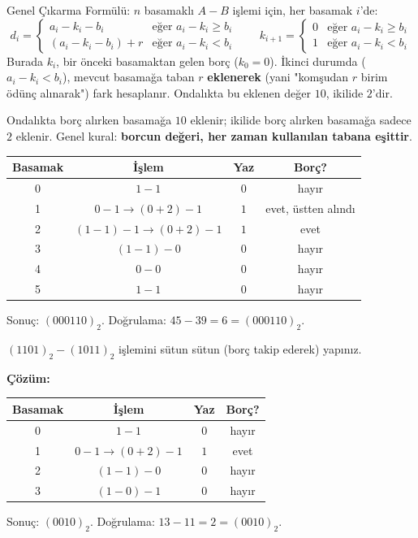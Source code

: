 \begin{tanim}{Genel Çıkarma Formülü:}
$n$ basamaklı $A-B$ işlemi için, her basamak $i$'de:
\[
d_i = \begin{cases}
a_i-k_i-b_i & \text{eğer } a_i-k_i \ge b_i \\
(a_i-k_i-b_i)+r & \text{eğer } a_i-k_i < b_i
\end{cases}
\qquad
k_{i+1} = \begin{cases}
0 & \text{eğer } a_i-k_i \ge b_i \\
1 & \text{eğer } a_i-k_i < b_i
\end{cases}
\]
Burada $k_i$, bir önceki basamaktan gelen borç ($k_0{=}0$). İkinci durumda ($a_i-k_i<b_i$),
mevcut basamağa taban $r$ \textbf{eklenerek} (yani "komşudan $r$ birim ödünç alınarak") fark
hesaplanır. Ondalıkta bu eklenen değer $10$, ikilide $2$'dir.
\end{tanim}

Ondalıkta borç alırken basamağa $10$ eklenir; ikilide borç alırken basamağa sadece $2$
eklenir. Genel kural: \textbf{borcun değeri, her zaman kullanılan tabana eşittir}.

\begin{ornek}[$(101101)_2-(100111)_2$]
\begin{center}
\begin{tabular}{cccc}
\toprule
Basamak & İşlem & Yaz & Borç? \\
\midrule
0 & $1-1$ & $0$ & hayır \\
1 & $0-1 \to (0+2)-1$ & $1$ & evet, üstten alındı \\
2 & $(1-1)-1 \to (0+2)-1$ & $1$ & evet \\
3 & $(1-1)-0$ & $0$ & hayır \\
4 & $0-0$ & $0$ & hayır \\
5 & $1-1$ & $0$ & hayır \\
\bottomrule
\end{tabular}
\end{center}
Sonuç: $(000110)_2$. Doğrulama: $45-39=6=(000110)_2$. \checkmark
\end{ornek}

\begin{alistirma}[\kolay]
$(1101)_2-(1011)_2$ işlemini sütun sütun (borç takip ederek) yapınız.
\end{alistirma}

\noindent\textbf{Çözüm:}
\begin{center}
\begin{tabular}{cccc}
\toprule
Basamak & İşlem & Yaz & Borç? \\
\midrule
0 & $1-1$ & $0$ & hayır \\
1 & $0-1 \to (0+2)-1$ & $1$ & evet \\
2 & $(1-1)-0$ & $0$ & hayır \\
3 & $(1-0)-1$ & $0$ & hayır \\
\bottomrule
\end{tabular}
\end{center}
Sonuç: $(0010)_2$. Doğrulama: $13-11=2=(0010)_2$. \checkmark

